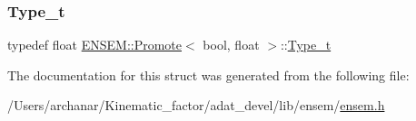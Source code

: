 \subsubsection{\texorpdfstring{Type\_t}{Type\_t}\hspace{0.1cm}{\footnotesize\ttfamily [2/2]}}
{\footnotesize\ttfamily typedef float \mbox{\hyperlink{structENSEM_1_1Promote}{E\+N\+S\+E\+M\+::\+Promote}}$<$ bool, float $>$\+::\mbox{\hyperlink{structENSEM_1_1Promote_3_01bool_00_01float_01_4_aac75d1edfea4b854f38644f46a79ad71}{Type\+\_\+t}}}



The documentation for this struct was generated from the following file\+:\begin{DoxyCompactItemize}
\item 
/\+Users/archanar/\+Kinematic\+\_\+factor/adat\+\_\+devel/lib/ensem/\mbox{\hyperlink{lib_2ensem_2ensem_8h}{ensem.\+h}}\end{DoxyCompactItemize}
